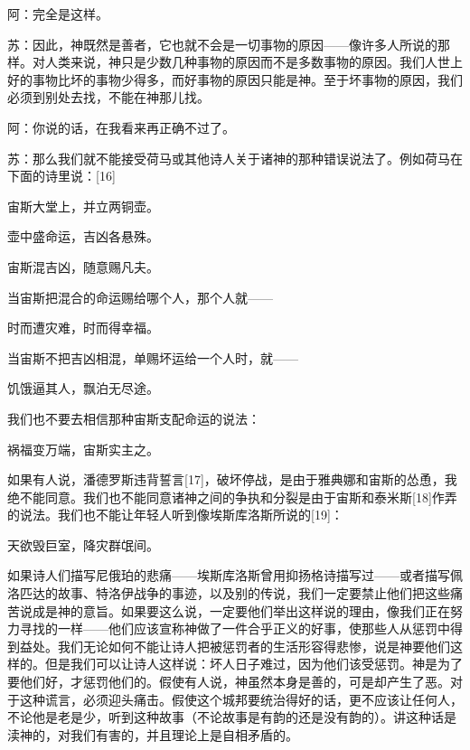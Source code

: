 \documentclass[12pt,oneside]{book}
\begin{document}
阿：完全是这样。

苏：因此，神既然是善者，它也就不会是一切事物的原因——像许多人所说的那样。对人类来说，神只是少数几种事物的原因而不是多数事物的原因。我们人世上好的事物比坏的事物少得多，而好事物的原因只能是神。至于坏事物的原因，我们必须到别处去找，不能在神那儿找。

阿：你说的话，在我看来再正确不过了。

苏：那么我们就不能接受荷马或其他诗人关于诸神的那种错误说法了。例如荷马在下面的诗里说：[16]





宙斯大堂上，并立两铜壶。

壶中盛命运，吉凶各悬殊。

宙斯混吉凶，随意赐凡夫。





当宙斯把混合的命运赐给哪个人，那个人就——





时而遭灾难，时而得幸福。





当宙斯不把吉凶相混，单赐坏运给一个人时，就——





饥饿逼其人，飘泊无尽途。





我们也不要去相信那种宙斯支配命运的说法：





祸福变万端，宙斯实主之。





如果有人说，潘德罗斯违背誓言[17]，破坏停战，是由于雅典娜和宙斯的怂恿，我绝不能同意。我们也不能同意诸神之间的争执和分裂是由于宙斯和泰米斯[18]作弄的说法。我们也不能让年轻人听到像埃斯库洛斯所说的[19]：





天欲毁巨室，降灾群氓间。





如果诗人们描写尼俄珀的悲痛——埃斯库洛斯曾用抑扬格诗描写过——或者描写佩洛匹达的故事、特洛伊战争的事迹，以及别的传说，我们一定要禁止他们把这些痛苦说成是神的意旨。如果要这么说，一定要他们举出这样说的理由，像我们正在努力寻找的一样——他们应该宣称神做了一件合乎正义的好事，使那些人从惩罚中得到益处。我们无论如何不能让诗人把被惩罚者的生活形容得悲惨，说是神要他们这样的。但是我们可以让诗人这样说：坏人日子难过，因为他们该受惩罚。神是为了要他们好，才惩罚他们的。假使有人说，神虽然本身是善的，可是却产生了恶。对于这种谎言，必须迎头痛击。假使这个城邦要统治得好的话，更不应该让任何人，不论他是老是少，听到这种故事（不论故事是有韵的还是没有韵的）。讲这种话是渎神的，对我们有害的，并且理论上是自相矛盾的。
\end{document}
